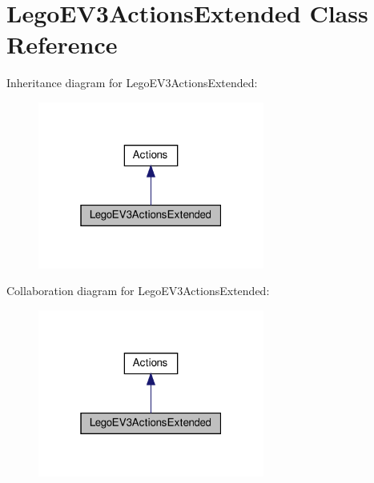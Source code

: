 \hypertarget{classLegoEV3ActionsExtended}{}\section{Lego\+E\+V3\+Actions\+Extended Class Reference}
\label{classLegoEV3ActionsExtended}


Inheritance diagram for Lego\+E\+V3\+Actions\+Extended\+:
\nopagebreak
\begin{figure}[H]
\begin{center}
\leavevmode
\includegraphics[width=211pt]{classLegoEV3ActionsExtended__inherit__graph}
\end{center}
\end{figure}


Collaboration diagram for Lego\+E\+V3\+Actions\+Extended\+:
\nopagebreak
\begin{figure}[H]
\begin{center}
\leavevmode
\includegraphics[width=211pt]{classLegoEV3ActionsExtended__coll__graph}
\end{center}
\end{figure}
